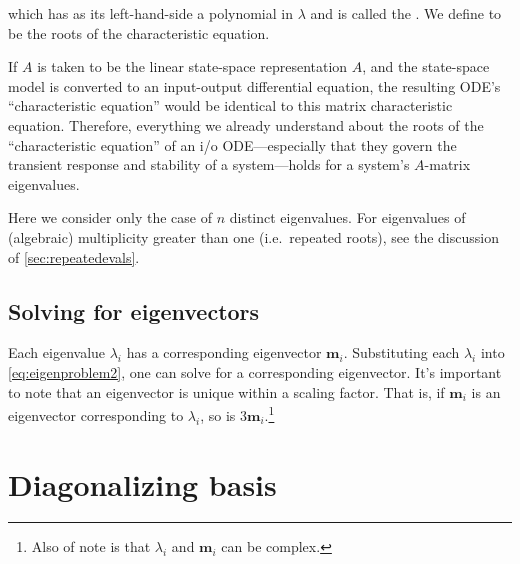 \documentclass[dynamic_systems.tex]{subfiles}
\begin{document}
which has as its left-hand-side a polynomial in $\lambda$ and is called the .
We define  to be the roots of the characteristic equation.
\begin{infobox}
If $A$ is taken to be the linear state-space representation $A$, and the state-space model is converted to an input-output differential equation, the resulting ODE's ``characteristic equation'' would be identical to this matrix characteristic equation.
Therefore, everything we already understand about the roots of the ``characteristic equation'' of an i/o ODE---especially that they govern the transient response and stability of a system---holds for a system's $A$-matrix eigenvalues.
\end{infobox}


Here we consider only the case of $n$ distinct eigenvalues.
For eigenvalues of (algebraic) multiplicity greater than one (i.e.\ repeated roots), see the discussion of \autoref{sec:repeatedevals}.
\tags{}

\subsection{Solving for eigenvectors}
\tags{}

Each eigenvalue $\lambda_i$ has a corresponding eigenvector $\bm{m}_i$.
Substituting each $\lambda_i$ into \autoref{eq:eigenproblem2}, one can solve for a corresponding eigenvector.
It's important to note that an eigenvector is unique within a scaling factor.
That is, if $\bm{m}_i$ is an eigenvector corresponding to $\lambda_i$, so is $3\bm{m}_i$.\footnote{Also of note is that $\lambda_i$ and $\bm{m}_i$ can be complex.}
\tags{}

%

\section{Diagonalizing basis}\label{lec:diagonalizing_matrix}
\tags{}
\end{document}
